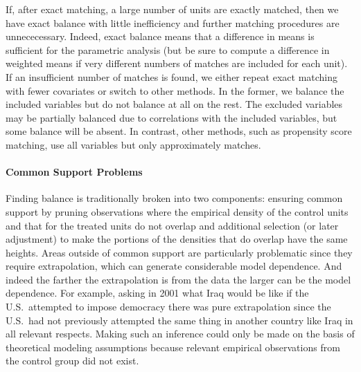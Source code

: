 \documentclass[11pt,titlepage]{article}
\begin{document}
If, after exact matching, a large number of units are exactly matched,
then we have exact balance with little inefficiency and further
matching procedures are unnececessary.  Indeed, exact balance means
that a difference in means is sufficient for the parametric analysis
(but be sure to compute a difference in weighted means if very
different numbers of matches are included for each unit).  If an
insufficient number of matches is found, we either repeat exact
matching with fewer covariates or switch to other methods.  In the
former, we balance the included variables but do not balance at all on
the rest.  The excluded variables may be partially balanced due to
correlations with the included variables, but some balance will be
absent.  In contrast, other methods, such as propensity score
matching, use all variables but only approximately matches.

\paragraph{Common Support Problems}
Finding balance is traditionally broken into two components: ensuring
common support by pruning observations where the empirical density of
the control units and that for the treated units do not overlap and
additional selection (or later adjustment) to make the portions of the
densities that do overlap have the same heights.  Areas outside of
common support are particularly problematic since they require
extrapolation, which can generate considerable model dependence.  And
indeed the farther the extrapolation is from the data the larger can
be the model dependence.  For example, asking in 2001 what Iraq would
be like if the U.S.\ attempted to impose democracy there was pure
extrapolation since the U.S.\ had not previously attempted the same
thing in another country like Iraq in all relevant respects.  Making
such an inference could only be made on the basis of theoretical
modeling assumptions because relevant empirical observations from the
control group did not exist.
\end{document}
